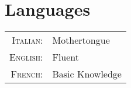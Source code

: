 \section{Languages}
\begin{tabular}{rl}
 \textsc{Italian:}&Mothertongue\\
 \textsc{English:}&Fluent\\
 \textsc{French:}&Basic Knowledge\\
 \end{tabular}

